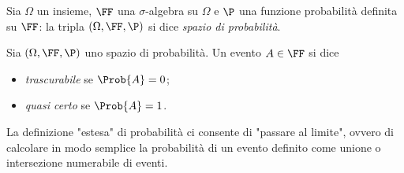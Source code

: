 \begin{definition}
     Sia $\Omega$ un insieme, $\FF$ una $\sigma$-algebra su $\Omega$ e $\P$ una funzione probabilità definita su $\FF$: la tripla $(\Omega, \FF, \P)$ si dice \emph{spazio di probabilità}.
\end{definition}

\begin{definition}
     Sia $(\Omega, \FF, \P)$ uno spazio di probabilità. Un evento $A \in \FF$ si dice \begin{itemize}
        \item \emph{trascurabile} se $\Prob{A} = 0$;
        \item \emph{quasi certo} se $\Prob{A} = 1$.
    \end{itemize}
\end{definition}

La definizione "estesa" di probabilità ci consente di "passare al limite", ovvero di calcolare in modo semplice la probabilità di un evento definito come unione o intersezione numerabile di eventi.

